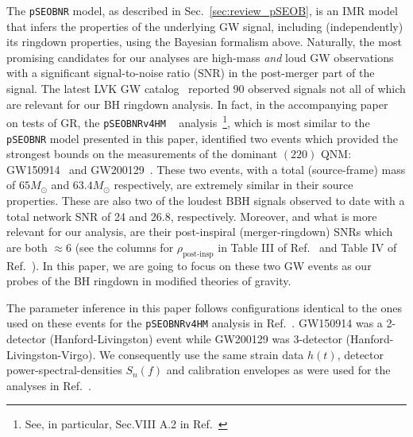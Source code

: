 \documentclass[twocolumn,
               prd,
               aps,
               superscriptaddress,
               tightenlines,
               nofootinbib,
               eqsecnum,
               amsfonts,
               amsmath,
               longbibliography]{revtex4-1}
\newcommand{\Mo}{M_{\odot}}
\newcommand{\pSEOB}{\texttt{pSEOBNR}}
\begin{document}
The \pSEOB{} model, as described in Sec.~\ref{sec:review_pSEOB}, is an
IMR model that infers the properties of the underlying GW signal,
including (independently) its ringdown properties, using the Bayesian formalism
above. Naturally, the most promising candidates for our analyses are high-mass
\emph{and} loud GW observations with a significant signal-to-noise ratio (SNR)
in the post-merger part of the signal.
%
The latest LVK GW catalog~\cite{LIGOScientific:2021djp} reported 90 observed
signals not all of which are relevant for our BH ringdown analysis. In fact, in
the accompanying paper~\cite{LIGOScientific:2021sio} on tests of GR, the \texttt{pSEOBNRv4HM}
~\cite{Brito:2018rfr,Ghosh:2021mrv} analysis~\footnote{See, in particular, Sec.VIII A.2
in Ref.~\cite{LIGOScientific:2021sio}}, which is most similar to the \pSEOB{} model
presented in this paper, identified two events which provided the strongest
bounds on the measurements of the dominant $(220)$ QNM:
GW150914~\cite{LIGOScientific:2016aoc} and
GW200129~\cite{LIGOScientific:2021djp}.
%
These two events, with a total (source-frame) mass of $65 \Mo$ and $63.4 \Mo$ respectively, are
extremely similar in their source properties. These are also two of the loudest
BBH signals observed to date with a total network SNR of 24 and 26.8,
respectively.
%
Moreover, and what is more relevant for our analysis, are their post-inspiral
(merger-ringdown) SNRs which are both $\approx 6$ (see the columns for
$\rho_{\text{post-insp}}$ in Table III of Ref.~\cite{LIGOScientific:2019fpa} and
Table IV of Ref.~\cite{LIGOScientific:2021sio}).
%
In this paper, we are going to focus on these two GW events as our probes of
the BH ringdown in modified theories of gravity.

The parameter inference in this paper follows configurations identical to the
ones used on these events for the \texttt{pSEOBNRv4HM} analysis in
Ref.~\cite{LIGOScientific:2021sio}. GW150914 was a 2-detector (Hanford-Livingston) event while
GW200129 was 3-detector (Hanford-Livingston-Virgo).
%
We consequently use the same strain data $h(t)$, detector
power-spectral-densities $S_n(f)$ and calibration envelopes as were used for
the analyses in Ref.~\cite{LIGOScientific:2021sio}.
%
%
\end{document}
